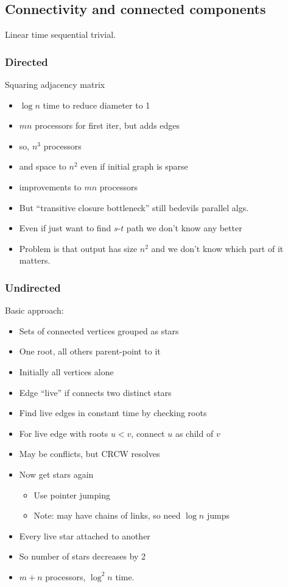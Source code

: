 \documentclass[12pt]{article}
\begin{document}
\subsection*{Connectivity and connected components}

Linear time sequential trivial.

\subsubsection*{Directed}

Squaring adjacency matrix
\begin{itemize}
\item $\log n$ time to reduce diameter to 1
\item $mn$ processors for first iter, but adds edges
\item so, $n^3$ processors
\item and space to $n^2$ even if initial graph is sparse
\item improvements to $mn$ processors
\item But ``transitive closure bottleneck'' still bedevils parallel
  algs.
\item Even if just want to find $s$-$t$ path we don't know any better
\item Problem is that output has size $n^2$ and we don't know which
  part of it matters.
\end{itemize}

\subsubsection*{Undirected}

Basic approach:
\begin{itemize}
\item Sets of connected vertices grouped as stars
\item One root, all others parent-point to it
\item Initially all vertices alone
\item Edge ``live'' if connects two distinct stars
\item Find live edges in constant time by checking roots
\item For live edge with roots $u<v$, connect $u$ as child of $v$
\item May be conflicts, but CRCW resolves
\item Now get stars again
\begin{itemize}
\item Use pointer jumping
\item Note: may have chains of links, so need $\log n$ jumps
\end{itemize}
\item Every live star attached to another
\item So number of stars decreases by 2
\item $m+n$ processors, $\log^2 n$ time.
\end{itemize}
\end{document}

